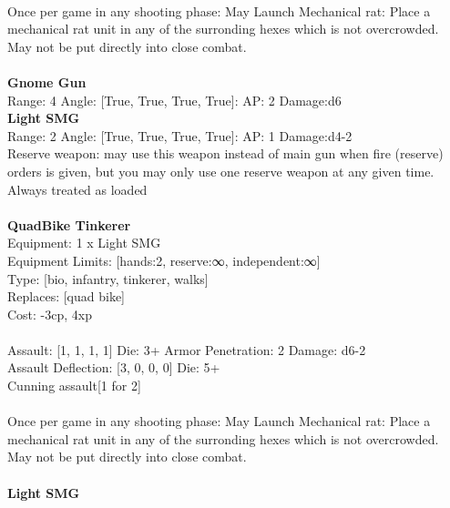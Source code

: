 \ \\
Once per game in any shooting phase: May Launch Mechanical rat: Place a mechanical rat unit in any of the surronding hexes which is not overcrowded. May not be put directly into close combat. \\ 

\ \\
{\bf Gnome Gun } \\



Range: 4  Angle: [True, True, True, True]: AP: 2 Damage:d6 \\




{\bf Light SMG } \\



Range: 2  Angle: [True, True, True, True]: AP: 1 Damage:d4-2 \\
Reserve weapon: may use this weapon instead of main gun when fire (reserve) orders is given, but you may only use one reserve weapon at any given time.\\ 
Always treated as loaded\\ 




 
\ \\

{\bf QuadBike Tinkerer } \\
Equipment: 1 x Light SMG \\
Equipment Limits: [hands:2, reserve:∞, independent:∞] \\
Type: [bio, infantry, tinkerer, walks] \\
Replaces: [quad bike] \\
Cost: -3cp, 4xp\\
\ \\
Assault: [1, 1, 1, 1] Die: 3+ Armor Penetration: 2 Damage: d6-2 \\
Assault Deflection: [3, 0, 0, 0] Die: 5+\\
\indent Cunning assault[1 for 2]\\ 
 
\ \\
Once per game in any shooting phase: May Launch Mechanical rat: Place a mechanical rat unit in any of the surronding hexes which is not overcrowded. May not be put directly into close combat. \\ 

\ \\
{\bf Light SMG } \\



